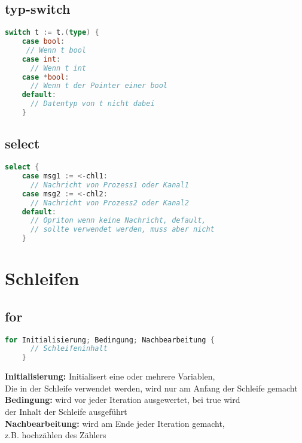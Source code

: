 \documentclass[twoside,a4paper,12pt]{article}
\begin{document}
\subsection{typ-switch}
\begin{center}
  \begin{minipage}{1.0\textwidth}
    \begin{lstlisting}[language=Go]
    switch t := t.(type) {
    case bool:
     // Wenn t bool
    case int:
      // Wenn t int 
    case *bool:
      // Wenn t der Pointer einer bool 
    default: 
      // Datentyp von t nicht dabei
    } 
    \end{lstlisting}
  \end{minipage}
\end{center}

\subsection{select}
\begin{center}
  \begin{minipage}{1.0\textwidth}
    \begin{lstlisting}[language=Go]
    select {
    case msg1 := <-chl1:
      // Nachricht von Prozess1 oder Kanal1 
    case msg2 := <-chl2:
      // Nachricht von Prozess2 oder Kanal2
    default:
      // Opriton wenn keine Nachricht, default, 
      // sollte verwendet werden, muss aber nicht
    }
    \end{lstlisting}
  \end{minipage}
\end{center}

\section{Schleifen}
\subsection{for}
\begin{center}
  \begin{minipage}{1.0\textwidth}
    \begin{lstlisting}[language=Go]
    for Initialisierung; Bedingung; Nachbearbeitung {
      // Schleifeninhalt
    }
    \end{lstlisting}
  \end{minipage}
\end{center}
\textbf{Initialisierung:} Initialisert eine oder mehrere Variablen, \\ 
Die in der Schleife verwendet werden, wird nur am Anfang der Schleife gemacht \\ 
\textbf{Bedingung:} wird vor jeder Iteration ausgewertet, bei true wird \\ 
der Inhalt der Schleife ausgeführt \\ 
\textbf{Nachbearbeitung:} wird am Ende jeder Iteration gemacht, \\ 
z.B. hochzählen des Zählers \\ 
\end{document}
